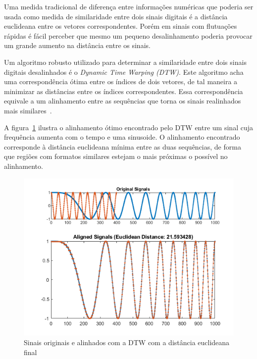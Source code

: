 Uma medida tradicional de diferença entre informações numéricas que poderia ser usada como medida de similaridade entre dois sinais digitais é a distância euclideana entre os vetores correspondentes. Porém em sinais com flutuações rápidas é fácil perceber que mesmo um pequeno desalinhamento poderia provocar um grande aumento na distância entre os sinais.

Um algoritmo robusto utilizado para determinar a similaridade entre dois sinais digitais desalinhados é o \textit{Dynamic Time Warping (DTW)}. Este algoritmo acha uma correspondência ótima entre os índices de dois vetores, de tal maneira a minimizar as distâncias entre os índices correspondentes. Essa correspondência equivale a um alinhamento entre as sequências que torna os sinais realinhados mais similares~\citep{shou2005fast}. 

A figura~\ref{fig:matlab-dtw} ilustra o alinhamento ótimo encontrado pelo DTW entre um sinal cuja frequência aumenta com o tempo e uma sinusoide. O alinhamento encontrado corresponde à distância euclideana mínima entre as duas sequências, de forma que regiões com formatos similares estejam o mais próximas o possível no alinhamento.

\begin{figure}[htb]
\centering
\includegraphics[width=12cm]{figuras/DynamicTimeWarpingOfRealChirpAndSinusoidExample_01.png}
\caption{Sinais originais e alinhados com a DTW com a distância euclideana final \citep{matlab-dtw}}
\label{fig:matlab-dtw}
\end{figure}

\newcommand{\dist}{\mbox{dist}}

